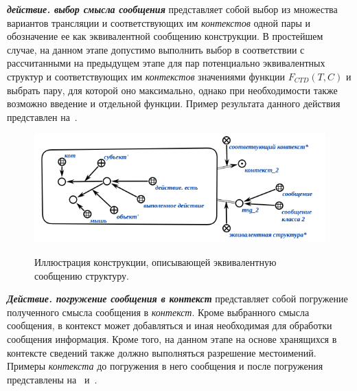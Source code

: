 \textbf{\textit{действие. выбор смысла сообщения}} представляет собой выбор из множества вариантов трансляции и соответствующих им \textit{контекстов} одной пары и обозначение ее как эквивалентной сообщению конструкции.
В простейшем случае, на данном этапе допустимо выполнить выбор в соответствии с рассчитанными на предыдущем этапе для пар потенциально эквивалентных структур и соответствующих им \textit{контекстов} значениями функции \textit{$F_{CTD}(T, C)$} и выбрать пару, для которой оно максимально, однако при необходимости также возможно введение и отдельной функции.
Пример результата данного действия представлен на~\textit{}.

\begin{figure}[H]
    \centering
    \caption{Иллюстрация конструкции, описывающей эквивалентную сообщению структуру.}
    \includegraphics[scale=0.8]{images/part4/chapter_nl_interfaces/message_equivalent_structure}
    \label{fig:message_equivalent_structure}
\end{figure}

\textbf{\textit{Действие. погружение сообщения в контекст}} представляет собой погружение полученного смысла сообщения в \textit{контекст}.
Кроме выбранного смысла сообщения, в контекст может добавляться и иная необходимая для обработки сообщения информация.
Кроме того, на данном этапе на основе хранящихся в контексте сведений также должно выполняться разрешение местоимений.
Примеры \textit{контекста} до погружения в него сообщения и после погружения представлены на~\textit{} и~\textit{}.

